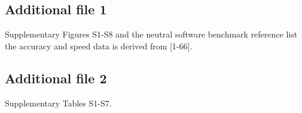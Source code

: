 \documentclass{bmcart}
\begin{document}
\begin{backmatter}
\subsection*{Additional file 1}

{\color{black}Supplementary Figures S1-S8 and the neutral software benchmark reference list the accuracy and speed data is derived from [1-66].}

\subsection*{Additional file 2}

{\color{black}Supplementary Tables S1-S7.}

%



\end{backmatter}
\end{document}
